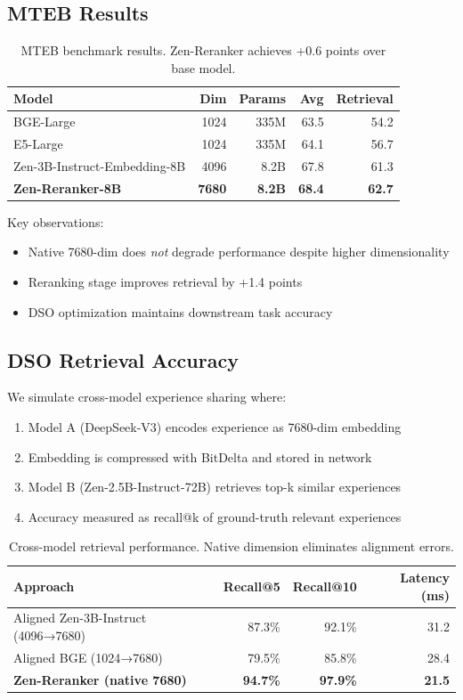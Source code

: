 \documentclass[11pt,letterpaper]{article}
\begin{document}
\subsection{MTEB Results}

\begin{table}[h]
\centering
\begin{tabular}{lrrrr}
\toprule
\textbf{Model} & \textbf{Dim} & \textbf{Params} & \textbf{Avg} & \textbf{Retrieval} \\
\midrule
BGE-Large & 1024 & 335M & 63.5 & 54.2 \\
E5-Large & 1024 & 335M & 64.1 & 56.7 \\
Zen-3B-Instruct-Embedding-8B & 4096 & 8.2B & 67.8 & 61.3 \\
\textbf{Zen-Reranker-8B} & \textbf{7680} & \textbf{8.2B} & \textbf{68.4} & \textbf{62.7} \\
\bottomrule
\end{tabular}
\caption{MTEB benchmark results. Zen-Reranker achieves +0.6 points over base model.}
\end{table}

Key observations:
\begin{itemize}
    \item Native 7680-dim does \emph{not} degrade performance despite higher dimensionality
    \item Reranking stage improves retrieval by +1.4 points
    \item DSO optimization maintains downstream task accuracy
\end{itemize}

\subsection{DSO Retrieval Accuracy}

We simulate cross-model experience sharing where:
\begin{enumerate}
    \item Model A (DeepSeek-V3) encodes experience as 7680-dim embedding
    \item Embedding is compressed with BitDelta and stored in network
    \item Model B (Zen-2.5B-Instruct-72B) retrieves top-k similar experiences
    \item Accuracy measured as recall@k of ground-truth relevant experiences
\end{enumerate}

\begin{table}[h]
\centering
\begin{tabular}{lrrr}
\toprule
\textbf{Approach} & \textbf{Recall@5} & \textbf{Recall@10} & \textbf{Latency (ms)} \\
\midrule
Aligned Zen-3B-Instruct (4096→7680) & 87.3\% & 92.1\% & 31.2 \\
Aligned BGE (1024→7680) & 79.5\% & 85.8\% & 28.4 \\
\textbf{Zen-Reranker (native 7680)} & \textbf{94.7\%} & \textbf{97.9\%} & \textbf{21.5} \\
\bottomrule
\end{tabular}
\caption{Cross-model retrieval performance. Native dimension eliminates alignment errors.}
\end{table}
\end{document}
